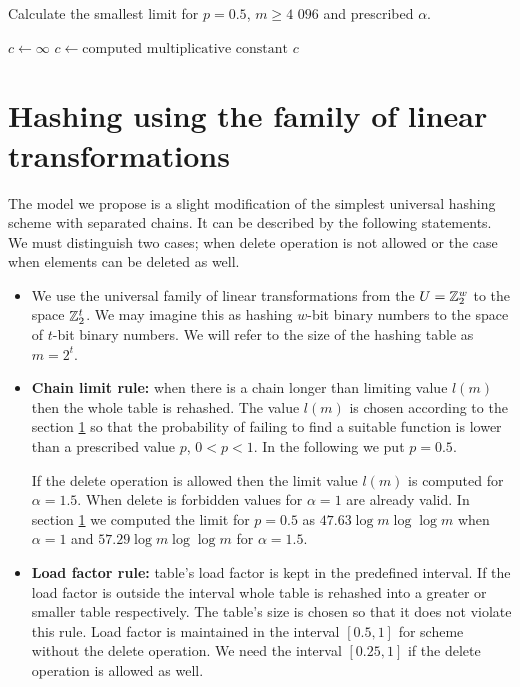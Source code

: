 \begin{algorithm}
\caption{Calculate the smallest limit for $p=0.5$, $m \geq \text{4 096}$ and prescribed $\alpha$.}
\label{algorithm-scheme-3}
\begin{algorithmic}
\STATE $c \leftarrow \infty$
				\STATE $c \leftarrow \text{computed multiplicative constant}$
			\ENDIF
		\ENDFOR
	\ENDFOR
\ENDFOR
\STATE
\RETURN $c$
\end{algorithmic}
\end{algorithm}

\section{Hashing using the family of linear transformations}
\label{section-hashing-linear-transformations}
The model we propose is a slight modification of the simplest universal hashing scheme with separated chains. It can be described by the following statements. We must distinguish two cases; when delete operation is not allowed or the case when elements can be deleted as well.
\begin{itemize}
\item We use the universal family of linear transformations from the $U = \mathbb{Z}_{2}^{w}$ to the space $\mathbb{Z}_{2}^{t}$. We may imagine this as hashing $w$-bit binary numbers to the space of $t$-bit binary numbers. We will refer to the size of the hashing table as $m = 2 ^ t$.
\item \textbf{Chain limit rule:} when there is a chain longer than limiting value $l(m)$ then the whole table is rehashed. The value $l(m)$ is chosen according to the section \ref{section-hashing-linear-transformations} so that the probability of failing to find a suitable function is lower than a prescribed value $p$, $0 < p < 1$. In the following we put $p = 0.5$. 

If the delete operation is allowed then the limit value $l(m)$ is computed for $\alpha = 1.5$. When delete is forbidden values for $\alpha = 1$ are already valid. In section \ref{section-hashing-linear-transformations} we computed the limit for $p = 0.5$ as $47.63 \log m \log \log m$ when $\alpha = 1$ and $57.29 \log m \log \log m$ for $\alpha = 1.5$.
\item \textbf{Load factor rule:} table's load factor is kept in the predefined interval. If the load factor is outside the interval whole table is rehashed into a greater or smaller table respectively. The table's size is chosen so that it does not violate this rule. Load factor is maintained in the interval $\left[0.5, 1\right]$ for scheme without the delete operation. We need the interval $\left[0.25, 1\right]$ if the delete operation is allowed as well.
\end{itemize}

